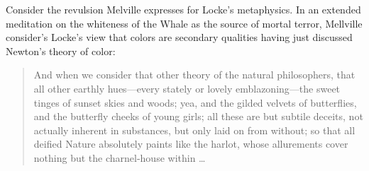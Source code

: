 Consider the revulsion Melville expresses for Locke's \citeyearpar{Locke:1706hc} metaphysics. In an extended meditation on the whiteness of the Whale as the source of mortal terror, Mellville consider's Locke's view that colors are secondary qualities having just discussed Newton's theory of color:
\begin{quote}
	And when we consider that other theory of the natural philosophers, that all other earthly hues---every stately or lovely emblazoning---the sweet tinges of sunset skies and woods; yea, and the gilded velvets of butterflies, and the butterfly cheeks of young girls; all these are but subtile deceits, not actually inherent in substances, but only laid on from without; so that all deified Nature absolutely paints like the harlot, whose allurements cover nothing but the charnel-house within \ldots\ \citep[ch. 42]{Melville:1851ms}
\end{quote}

